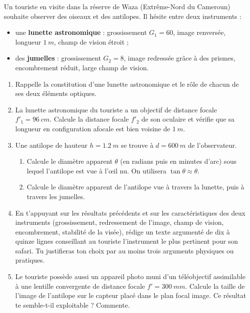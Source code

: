 \documentclass[11pt]{article}
\begin{document}
\begin{exercice}
Un touriste en visite dans la réserve de Waza (Extrême-Nord du Cameroun) souhaite observer des oiseaux et des antilopes. Il hésite entre deux instruments :
\begin{itemize}
\item une \textbf{lunette astronomique} : grossissement $G_1 = 60$, image renversée, longueur $\SI{1}{m}$, champ de vision étroit ;
\item des \textbf{jumelles} : grossissement $G_2 = 8$, image redressée grâce à des prismes, encombrement réduit, large champ de vision.
\end{itemize}
\begin{enumerate}
\item Rappelle la constitution d'une lunette astronomique et le rôle de chacun de ses deux éléments optiques.
\item La lunette astronomique du touriste a un objectif de distance focale $f'_1 = \SI{96}{cm}$. Calcule la distance focale $f'_2$ de son oculaire et vérifie que sa longueur en configuration afocale est bien voisine de $\SI{1}{m}$.
\item Une antilope de hauteur $h = \SI{1,2}{m}$ se trouve à $d = \SI{600}{m}$ de l'observateur.
\begin{enumerate}
\item[a)] Calcule le diamètre apparent $\theta$ (en radians puis en minutes d'arc) sous lequel l'antilope est vue à l'œil nu. On utilisera $\tan\theta \approx \theta$.
\item[b)] Calcule le diamètre apparent de l'antilope vue à travers la lunette, puis à travers les jumelles.
\end{enumerate}
\item En t'appuyant sur les résultats précédents et sur les caractéristiques des deux instruments (grossissement, redressement de l'image, champ de vision, encombrement, stabilité de la visée), rédige un texte argumenté de dix à quinze lignes conseillant au touriste l'instrument le plus pertinent pour son safari. Tu justifieras ton choix par au moins trois arguments physiques ou pratiques.
\item Le touriste possède aussi un appareil photo muni d'un téléobjectif assimilable à une lentille convergente de distance focale $f' = \SI{300}{mm}$. Calcule la taille de l'image de l'antilope sur le capteur placé dans le plan focal image. Ce résultat te semble-t-il exploitable ? Commente.
\end{enumerate}
\end{exercice}
\end{document}
